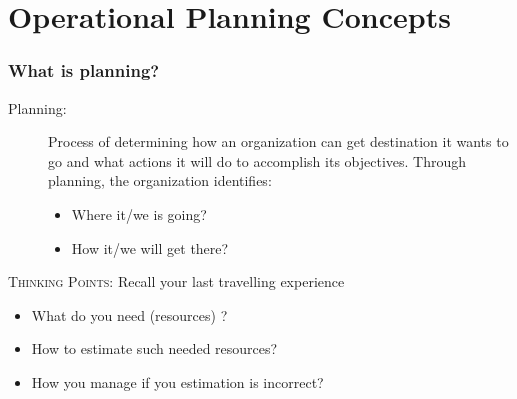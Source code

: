 \documentclass[10pt,handout,notes=show]{beamer}
\begin{document}
\section[Planning]{Operational Planning Concepts}
\begin{frame}
  \frametitle{What is planning?}

  \begin{description}
    \item[Planning:] Process of determining \alert{how} an organization can get \alert{destination} it wants to go and what \alert{actions} it will do to accomplish its objectives. Through planning, the organization identifies:
      \begin{itemize}
        \item Where it/we is going?
        \item How it/we will get there?
      \end{itemize}
  \end{description}

  \NextLine
  \textsc{Thinking Points:} Recall your last travelling experience
  \begin{itemize}
    \item<2-> What do you need (\alert{resources}) ?
    \item<2-> How to \alert{estimate} such needed resources?
    \item<2-> How you \alert{manage} if you estimation is incorrect?
  \end{itemize}




\end{frame}
\end{document}

